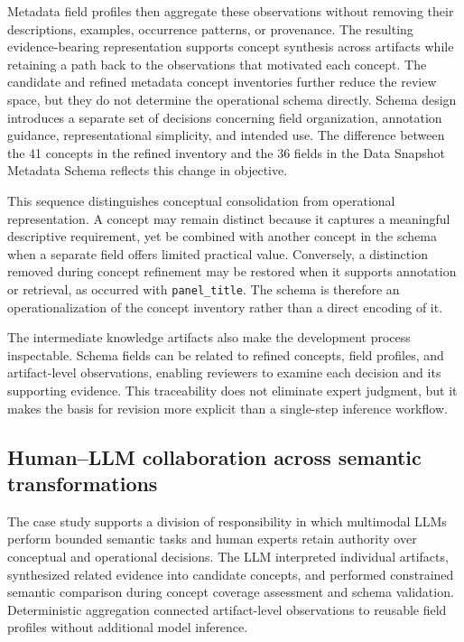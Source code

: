 \documentclass{article}
\begin{document}
Metadata field profiles then aggregate these observations without removing their descriptions, examples, occurrence patterns, or provenance. The resulting evidence-bearing representation supports concept synthesis across artifacts while retaining a path back to the observations that motivated each concept. The candidate and refined metadata concept inventories further reduce the review space, but they do not determine the operational schema directly. Schema design introduces a separate set of decisions concerning field organization, annotation guidance, representational simplicity, and intended use. The difference between the 41 concepts in the refined inventory and the 36 fields in the Data Snapshot Metadata Schema reflects this change in objective.

This sequence distinguishes conceptual consolidation from operational representation. A concept may remain distinct because it captures a meaningful descriptive requirement, yet be combined with another concept in the schema when a separate field offers limited practical value. Conversely, a distinction removed during concept refinement may be restored when it supports annotation or retrieval, as occurred with \texttt{panel\_title}. The schema is therefore an operationalization of the concept inventory rather than a direct encoding of it.

The intermediate knowledge artifacts also make the development process inspectable. Schema fields can be related to refined concepts, field profiles, and artifact-level observations, enabling reviewers to examine each decision and its supporting evidence. This traceability does not eliminate expert judgment, but it makes the basis for revision more explicit than a single-step inference workflow.

\subsection{Human--LLM collaboration across semantic transformations}

The case study supports a division of responsibility in which multimodal LLMs perform bounded semantic tasks and human experts retain authority over conceptual and operational decisions. The LLM interpreted individual artifacts, synthesized related evidence into candidate concepts, and performed constrained semantic comparison during concept coverage assessment and schema validation. Deterministic aggregation connected artifact-level observations to reusable field profiles without additional model inference.
\end{document}
